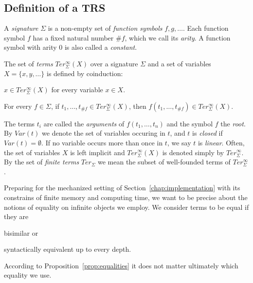 \subsection{Definition of a TRS}\label{sub:trs}

\begin{definition}%
A \emph{signature} $\Sigma$ is a non-empty set of \emph{function symbols} $f,
g, \ldots$. Each function symbol $f$ has a fixed natural number $\#f$, which
we call its \emph{arity}. A function symbol with arity $0$ is also called a
\emph{constant}.
\end{definition}

\begin{definition}%
The set of \emph{terms} $Ter_\Sigma^\infty(X)$ over a signature $\Sigma$ and a
set of variables $X = \{x, y, \ldots\}$ is defined by coinduction:
\begin{compactenum}
  \item
    $x \in Ter_\Sigma^\infty(X)$ for every variable $x \in X$.
  \item
    For every $f \in \Sigma$, if $t_1, \ldots, t_{\#f} \in
    Ter_\Sigma^\infty(X)$, then $f(t_1, \ldots, t_{\#f}) \in
    Ter_\Sigma^\infty(X)$.
\end{compactenum}
\end{definition}

The terms $t_i$ are called the \emph{arguments} of $f(t_1, \ldots, t_n)$ and
the symbol $f$ the \emph{root}. By $Var(t)$ we denote the set of variables
occuring in $t$, and $t$ is \emph{closed} if $Var(t) = \emptyset$. If no
variable occurs more than once in $t$, we say $t$ is \emph{linear}.
Often, the set of variables $X$ is left implicit and $Ter_\Sigma^\infty(X)$ is
denoted simply by $Ter_\Sigma^\infty$. By the set of \emph{finite terms}
$Ter_\Sigma$ we mean the subset of well-founded terms of $Ter_\Sigma^\infty$.


Preparing for the mechanized setting of Section~\ref{chap:implementation} with
its constrains of finite memory and computing time, we want to be precise
about the notions of equality on infinite objects we employ. We consider terms
to be equal if they are
\begin{inparaenum}[(i)]
  \item bisimilar or
  \item syntactically equivalent up to every depth.
\end{inparaenum} According to Proposition~\ref{prop:equalities} it does not
matter ultimately which equality we use.


